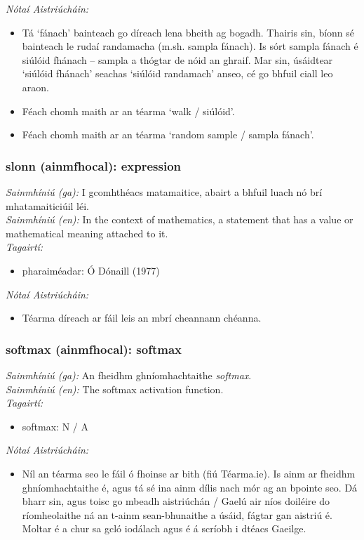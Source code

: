  \noindent \textit{Nótaí Aistriúcháin:}
\begin{itemize}
	\item Tá `fánach' bainteach go díreach lena bheith ag bogadh. Thairis sin, bíonn sé bainteach le rudaí randamacha (m.sh. sampla fánach). Is sórt sampla fánach é siúlóid fhánach -- sampla a thógtar de nóid an ghraif. Mar sin, úsáidtear `siúlóid fhánach' seachas `siúlóid randamach' anseo, cé go bhfuil ciall leo araon.
	\item Féach chomh maith ar an téarma `walk / siúlóid'.
	\item Féach chomh maith ar an téarma `random sample / sampla fánach'.
\end{itemize}


\subsubsection*{slonn (ainmfhocal): expression}
 \noindent \textit{Sainmhíniú (ga):} I gcomhthéacs matamaitice, abairt a bhfuil luach nó brí mhatamaiticiúil léi.
\\
 \noindent \textit{Sainmhíniú (en):} In the context of mathematics, a statement that has a value or mathematical meaning attached to it.
\\
 \noindent \textit{Tagairtí:}
\begin{itemize}
	\item pharaiméadar: Ó Dónaill (1977) \cite{odonaill}
\end{itemize}

 \noindent \textit{Nótaí Aistriúcháin:}
\begin{itemize}
	\item Téarma díreach ar fáil leis an mbrí cheannann chéanna.
\end{itemize}


\subsubsection*{softmax (ainmfhocal): softmax}
 \noindent \textit{Sainmhíniú (ga):} An fheidhm ghníomhachtaithe  \noindent \textit{softmax}.
\\
 \noindent \textit{Sainmhíniú (en):} The softmax activation function.
\\
 \noindent \textit{Tagairtí:}
\begin{itemize}
	\item softmax: N / A
\end{itemize}

 \noindent \textit{Nótaí Aistriúcháin:}
\begin{itemize}
	\item Níl an téarma seo le fáil ó fhoinse ar bith (fiú Téarma.ie). Is ainm ar fheidhm ghníomhachtaithe é, agus tá sé ina ainm dílis nach mór ag an bpointe seo. Dá bharr sin, agus toisc go mbeadh aistriúchán / Gaelú air níos doiléire do ríomheolaithe ná an t-ainm sean-bhunaithe a úsáid, fágtar gan aistriú é. Moltar é a chur sa gcló iodálach agus é á scríobh i dtéacs Gaeilge.
\end{itemize}


